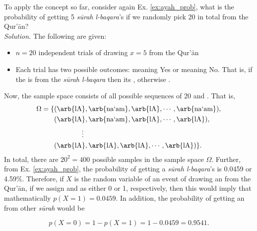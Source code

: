 \begin{exmp}\label{ex:binom_manual}
To apply the concept so far, consider again Ex. \ref{ex:ayah_prob}, what is the probability of getting 5 \textit{s\=urah l-baqara}'s   if we randomly pick 20   in total from the Qur'\=an?\\
\textit{Solution.} The following are given:
\begin{itemize}
    \item $n=20$ independent trials of drawing $x=5$  from the Qur'\=an
    \item Each trial has two possible outcomes:   meaning Yes or   meaning No. That is, if the    is from the \textit{s\=urah l-baqara}  then its , otherwise .
\end{itemize}
Now, the sample space consists of all possible sequences of 20  and . That is,
\begin{align}
    \Omega=\{&
        (\text{\arb{lA}},\text{\arb{na`am}},\text{\arb{lA}},\cdots,\text{\arb{na`am}}),\\
        &(\text{\arb{lA}},\text{\arb{na`am}},\text{\arb{lA}},\cdots,\text{\arb{lA}}),\\
        &\qquad\qquad\vdots\\
        &(\text{\arb{lA}},\text{\arb{lA}},\text{\arb{lA}},\cdots,\text{\arb{lA}})\}.
\end{align}
In total, there are $20^2=400$ possible samples in the sample space $\Omega$. Further, from Ex. \ref{ex:ayah_prob}, the probability of getting a \textit{s\=urah l-baqara}'s   is 0.0459 or 4.59\%. Therefore, if $X$ is the random variable of an event of drawing an  from the Qur'\=an, if we assign   and  as either 0 or 1, respectively, then this would imply that mathematically $ p(X=1)=0.0459$. In addition, the probability of getting an   from other \textit{s\=urah}  would be

\begin{equation}    
 p(X=0)=1- p(X=1)=1-0.0459=0.9541.
\end{equation}


\end{exmp}

